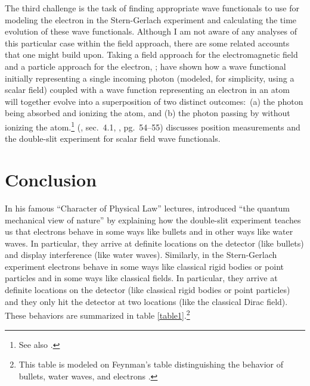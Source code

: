 \documentclass[onecolumn,secnumarabic,amsmath,amssymb,balancelastpage,nofootinbib]{article}
\begin{document}
The third challenge is the task of finding appropriate wave functionals to use for modeling the electron in the Stern-Gerlach experiment and calculating the time evolution of these wave functionals.  Although I am not aware of any analyses of this particular case within the field approach, there are some related accounts that one might build upon.  Taking a field approach for the electromagnetic field and a particle approach for the electron, \citet[sec.\ II.5]{bohm1987}; \citet[sec.\ 11.7]{bohmhiley} have shown how a wave functional initially representing a single incoming photon (modeled, for simplicity, using a scalar field) coupled with a wave function representing an electron in an atom will together evolve into a superposition of two distinct outcomes:\ (a) the photon being absorbed and ionizing the atom, and (b) the photon passing by without ionizing the atom.\footnote{See also \citet[sec.\ 4]{kaloyerou1994}.} \citeauthor{valentini1992} (\citeyear{valentini1992}, sec.\ 4.1, \citeyear{valentini1996}, pg.\ 54--55) discusses position measurements and the double-slit experiment for scalar field wave functionals.

\section{Conclusion}

In his famous ``Character of Physical Law'' lectures, \citet[ch.\ 6]{feynman} introduced ``the quantum mechanical view of nature'' by explaining how the double-slit experiment teaches us that electrons behave in some ways like bullets and in other ways like water waves.  In particular, they arrive at definite locations on the detector (like bullets) and display interference (like water waves).  Similarly, in the Stern-Gerlach experiment electrons behave in some ways like classical rigid bodies or point particles and in some ways like classical fields.  In particular, they arrive at definite locations on the detector (like classical rigid bodies or point particles) and they only hit the detector at two locations (like the classical Dirac field).  These behaviors are summarized in table \ref{table1}.\footnote{This table is modeled on Feynman's table distinguishing the behavior of bullets, water waves, and electrons \citep[figure 31]{feynman}.}
\end{document}
